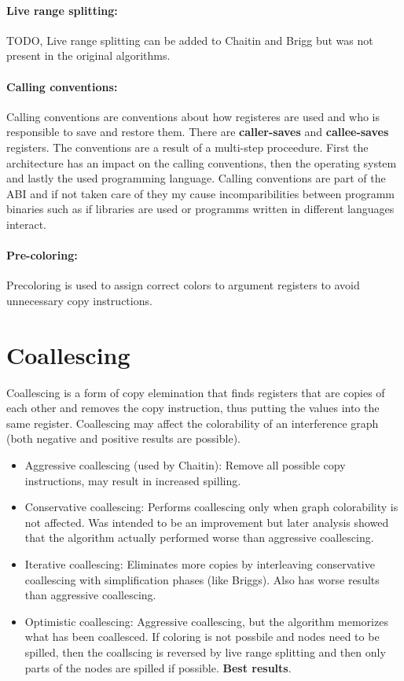 \documentclass[a4paper,10pt]{article}
\begin{document}
\paragraph{Live range splitting:} TODO, Live range splitting can be added to Chaitin and Brigg but was not present in the original algorithms.

\paragraph{Calling conventions:} Calling conventions are conventions about how registeres are used and who is responsible to save and 
restore them. There are \textbf{caller-saves} and \textbf{callee-saves} registers. The conventions are a result of a multi-step 
proceedure. First the architecture has an impact on the calling conventions, then the operating system and lastly the used programming 
language. Calling conventions are part of the ABI and if not taken care of they my cause incomparibilities between programm binaries such 
as if libraries are used or programms written in different languages interact.

\paragraph{Pre-coloring:} Precoloring is used to assign correct colors to argument registers to avoid unnecessary copy instructions.


\section{Coallescing}
Coallescing is a form of copy elemination that finds registers that are copies of each other and removes the copy instruction, thus
putting the values into the same register. Coallescing may affect the colorability of an interference graph (both negative and positive
results are possible).
\begin{itemize}
 \item Aggressive coallescing (used by Chaitin): Remove all possible copy instructions, may result in increased spilling.
 \item Conservative coallescing: Performs coallescing only when graph colorability is not affected. Was intended to be an improvement but 
       later analysis showed that the algorithm actually performed worse than aggressive coallescing.
 \item Iterative coallescing: Eliminates more copies by interleaving conservative coallescing with simplification phases (like Briggs). 
       Also has worse results than aggressive coallescing.
 \item Optimistic coallescing: Aggressive coallescing, but the algorithm memorizes what has been coallesced. If coloring is not possbile 
       and nodes need to be spilled, then the coallscing is reversed by live range splitting and then only parts of the nodes are spilled 
       if possible. \textbf{Best results}.
\end{itemize}
\end{document}
